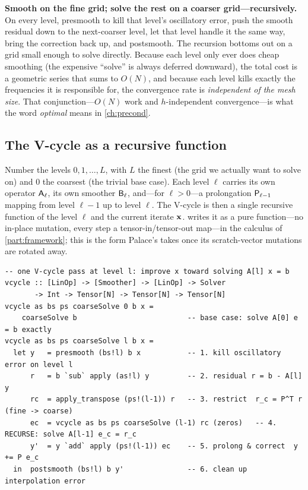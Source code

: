 \begin{keyidea}
\textbf{Smooth on the fine grid; solve the rest on a coarser grid---recursively.}
On every level, presmooth to kill that level's oscillatory error, push the smooth residual
down to the next-coarser level, let that level handle it the same way, bring the correction
back up, and postsmooth. The recursion bottoms out on a grid small enough to solve
directly. Because each level only ever does cheap smoothing (the expensive ``solve'' is
always deferred downward), the total cost is a geometric series that sums to $O(N)$, and
because each level kills exactly the frequencies it is responsible for, the convergence
rate is \emph{independent of the mesh size}. That conjunction---$O(N)$ work and
$h$-independent convergence---is what the word \emph{optimal} means in \cref{ch:precond}.
\end{keyidea}

\subsection{The V-cycle as a recursive function}

Number the levels $0, 1, \dots, L$, with $L$ the finest (the grid we actually want to
solve on) and $0$ the coarsest (the trivial base case). Each level $\ell$ carries its own
operator $\mathsf{A}_\ell$, its own smoother $\mathsf{B}_\ell$, and---for $\ell>0$---a
prolongation $\mathsf{P}_{\ell-1}$ mapping from level $\ell-1$ up to level $\ell$. The
V-cycle is then a single recursive function of the level $\ell$ and the current iterate
$\mathbf{x}$.  writes it as a pure function---no in-place mutation, every step a
tensor-in/tensor-out map---in the calculus of \cref{part:framework}; this is the form Palace's
 takes once its scratch-vector mutations are rotated away.

\begin{lstlisting}[style=l4style, caption={The V-cycle as a level-recursive pure function. Each call presmooths, restricts the residual, recurses on the coarser level, prolongs the returned correction, and postsmooths. The base case $\ell=0$ solves directly.}, label={lst:vcycle}]
-- one V-cycle pass at level l: improve x toward solving A[l] x = b
vcycle :: [LinOp] -> [Smoother] -> [LinOp] -> Solver
       -> Int -> Tensor[N] -> Tensor[N] -> Tensor[N]
vcycle as bs ps coarseSolve 0 b x =
    coarseSolve b                          -- base case: solve A[0] e = b exactly
vcycle as bs ps coarseSolve l b x =
  let y   = presmooth (bs!l) b x           -- 1. kill oscillatory error on level l
      r   = b `sub` apply (as!l) y         -- 2. residual r = b - A[l] y
      rc  = apply_transpose (ps!(l-1)) r   -- 3. restrict  r_c = P^T r   (fine -> coarse)
      ec  = vcycle as bs ps coarseSolve (l-1) rc (zeros)   -- 4. RECURSE: solve A[l-1] e_c = r_c
      y'  = y `add` apply (ps!(l-1)) ec    -- 5. prolong & correct  y += P e_c
  in  postsmooth (bs!l) b y'               -- 6. clean up interpolation error
\end{lstlisting}

